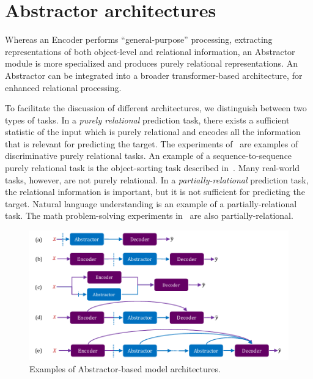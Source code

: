 \section{Abstractor architectures}\label{sec:abstractor_architectures}


Whereas an Encoder performs ``general-purpose'' processing, extracting representations of both object-level and relational information, an Abstractor module is more specialized and produces purely relational representations. An Abstractor can be integrated into a broader transformer-based architecture, for enhanced relational processing.

To facilitate the discussion of different architectures, we distinguish between two types of tasks. In a \textit{purely relational} prediction task, there exists a sufficient statistic of the input which is purely relational and encodes all the information that is relevant for predicting the target. The experiments of~\citep{esbn,kerg2022neural} are examples of discriminative purely relational tasks. An example of a sequence-to-sequence purely relational task is the object-sorting task described in~.
Many real-world tasks, however, are not purely relational. In a \textit{partially-relational} prediction task, the relational information is important, but it is not sufficient for predicting the target. Natural language understanding is an example of a partially-relational task. The math problem-solving experiments in~ are also partially-relational.

\begin{figure}
    \centering
    \includegraphics[width=.8\textwidth]{figures/abstractor_architectures.pdf}
    \caption{Examples of Abstractor-based model architectures.}\label{fig:abstractor_architectures}
    \vskip-10pt
\end{figure}


